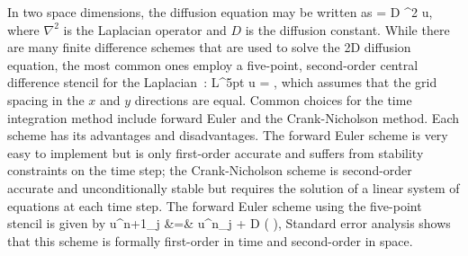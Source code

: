 \documentclass[oneeqnum,onefignum,onetabnum,onethmnum]{siamltex}
\begin{document}
In two space dimensions, the diffusion equation may be written as
\beq
   = D \nabla^2 u,
  \label{eq:diffusion_eqn_2d}
\eeq
where $\nabla^2$ is the Laplacian operator and $D$ is the diffusion constant. 
While there are many finite difference schemes that are used to solve the 
2D diffusion equation, the most common ones employ a five-point, second-order 
central difference stencil for the Laplacian~\cite{iserles_book}:
\beq
  L^{5pt} u = ,
  \label{eq:laplacian_2d_5pt_stencil}
\eeq
which assumes that the grid spacing in the $x$ and $y$ directions are
equal.  Common choices for the time integration method include forward Euler
and the Crank-Nicholson method.  Each scheme has its advantages and
disadvantages.  The forward Euler scheme is very easy to implement but is 
only first-order accurate and suffers from stability constraints on the time 
step; the Crank-Nicholson scheme is second-order accurate and unconditionally 
stable but requires the solution of a linear system of equations at each time 
step.  The forward Euler scheme using the five-point stencil is given by
\bea
  u^{n+1}_j &=& u^{n}_j 
  + D \dt 
    \left( 
    \right),
  \label{eq:diffusion_eqn_2d_5pt_scheme}
\eea
Standard error analysis shows that this scheme is formally first-order in 
time and second-order in space.
\end{document}
